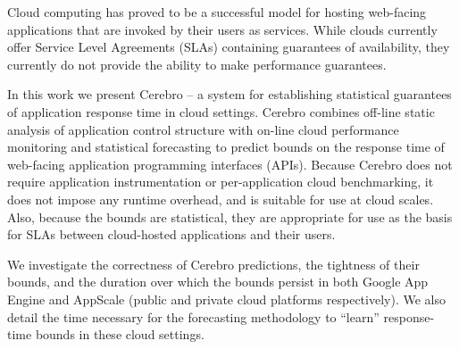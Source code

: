 Cloud computing has proved to be a successful model for hosting web-facing
applications that are invoked by their users as services.  While clouds
currently offer Service Level Agreements (SLAs) containing guarantees of
availability, they currently do not provide the ability to make performance
guarantees.

In this work we present Cerebro -- a system for establishing statistical
guarantees of application response time in cloud settings.  Cerebro combines
off-line static analysis of application control structure with on-line cloud
performance monitoring and statistical forecasting to predict bounds on the
response time of web-facing application programming interfaces (APIs).
Because Cerebro does not require application instrumentation or 
per-application cloud benchmarking, it does not impose any runtime overhead,
and is suitable for use at cloud scales.  Also, because the bounds are
statistical, they are appropriate for use as the basis for SLAs between
cloud-hosted applications and their users.

We investigate the correctness of Cerebro predictions, the tightness of their
bounds, and the duration over which the bounds persist in both Google App
Engine and AppScale (public and private cloud platforms respectively).  
We also detail the time necessary for the forecasting 
methodology to ``learn'' response-time bounds in these cloud settings. 


